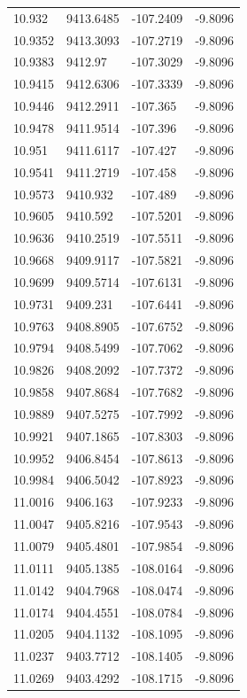 \begin{table}[H]
\begin{tabular}{llll}
10.932 & 9413.6485 & -107.2409 & -9.8096 \\
10.9352 & 9413.3093 & -107.2719 & -9.8096 \\
10.9383 & 9412.97 & -107.3029 & -9.8096 \\
10.9415 & 9412.6306 & -107.3339 & -9.8096 \\
10.9446 & 9412.2911 & -107.365 & -9.8096 \\
10.9478 & 9411.9514 & -107.396 & -9.8096 \\
10.951 & 9411.6117 & -107.427 & -9.8096 \\
10.9541 & 9411.2719 & -107.458 & -9.8096 \\
10.9573 & 9410.932 & -107.489 & -9.8096 \\
10.9605 & 9410.592 & -107.5201 & -9.8096 \\
10.9636 & 9410.2519 & -107.5511 & -9.8096 \\
10.9668 & 9409.9117 & -107.5821 & -9.8096 \\
10.9699 & 9409.5714 & -107.6131 & -9.8096 \\
10.9731 & 9409.231 & -107.6441 & -9.8096 \\
10.9763 & 9408.8905 & -107.6752 & -9.8096 \\
10.9794 & 9408.5499 & -107.7062 & -9.8096 \\
10.9826 & 9408.2092 & -107.7372 & -9.8096 \\
10.9858 & 9407.8684 & -107.7682 & -9.8096 \\
10.9889 & 9407.5275 & -107.7992 & -9.8096 \\
10.9921 & 9407.1865 & -107.8303 & -9.8096 \\
10.9952 & 9406.8454 & -107.8613 & -9.8096 \\
10.9984 & 9406.5042 & -107.8923 & -9.8096 \\
11.0016 & 9406.163 & -107.9233 & -9.8096 \\
11.0047 & 9405.8216 & -107.9543 & -9.8096 \\
11.0079 & 9405.4801 & -107.9854 & -9.8096 \\
11.0111 & 9405.1385 & -108.0164 & -9.8096 \\
11.0142 & 9404.7968 & -108.0474 & -9.8096 \\
11.0174 & 9404.4551 & -108.0784 & -9.8096 \\
11.0205 & 9404.1132 & -108.1095 & -9.8096 \\
11.0237 & 9403.7712 & -108.1405 & -9.8096 \\
11.0269 & 9403.4292 & -108.1715 & -9.8096 \\

\end{tabular}
\end{table}

